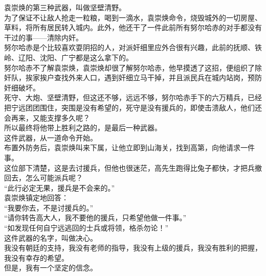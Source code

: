 \begin{multicols}{\theparacolNo}
袁崇焕的第三种武器，叫做坚壁清野。\\

为了保证不让敌人抢走一粒粮，喝到一滴水，袁崇焕命令，烧毁城外的一切房屋、草料，将所有居民转入城内。此外，他还干了一件此前所有努尔哈赤的对手都没有干过的事——清除内奸。\\

努尔哈赤是个比较喜欢耍阴招的人，对派奸细里应外合很有兴趣，此前的抚顺、铁岭、辽阳、沈阳、广宁都是这么拿下的。\\

努尔哈赤不了解袁崇焕，袁崇焕却很了解努尔哈赤，他早摸透了这招，便组织了除奸队，挨家挨户查找外来人口，遇到奸细立马干掉，并且派民兵在城内站岗，预防奸细破坏。\\

死守、大炮、坚壁清野，但这还不够，远远不够，努尔哈赤手下的六万精兵，已经把宁远团团围住，突围是没有希望的，死守是没有援兵的，即使击溃敌人，他们还会再来，又能支撑多久呢？\\

所以最终将他带上胜利之路的，是最后一种武器。\\

这件武器，从一道命令开始。\\

布置外防务后，袁崇焕叫来下属，让他立即到山海关，找到高第，向他请求一件事。\\

这位部下清楚，这是去讨援兵，但他也很迷茫，高先生跑得比兔子都快，才把兵撤回去，怎么可能派兵呢？\\

“此行必定无果，援兵是不会来的。”\\

袁崇焕镇定地回答：\\

“我要你去，不是讨援兵的。”\\

“请你转告高大人，我不要他的援兵，只希望他做一件事。”\\

“如发现任何自宁远逃回的士兵或将领，格杀勿论！”\\

这件武器的名字，叫做决心。\\

我没有朝廷的支持，我没有老师的指导，我没有上级的援兵，我没有胜利的把握，我没有幸存的希望。\\

但是，我有一个坚定的信念。\\


\end{multicols}
